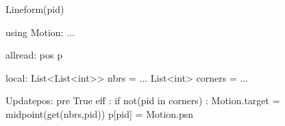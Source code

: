 Lineform(pid)

using Motion:
...

allread:
  pos p$\label{shapeformp}$

local:
  List<List<int>> nbrs = ...
  List<int> corners = ...
  

Updatepos:
  pre True
  eff :
     if not(pid in corners) :
        Motion.target = midpoint(get(nbrs,pid))
    p[pid] = Motion.psn

    